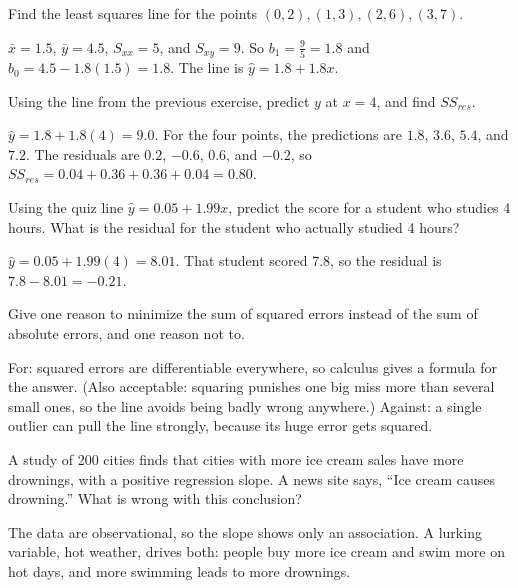 \begin{Exercise}[label=ls1, title=Solve by hand, space=3cm]
Find the least squares line for the points $(0,2), (1,3), (2,6), (3,7)$.
\end{Exercise}
\begin{Answer}[ref=ls1]
$\bar{x} = 1.5$, $\bar{y} = 4.5$, $S_{xx} = 5$, and $S_{xy} = 9$. So $b_1 = \frac{9}{5} = 1.8$ and
$b_0 = 4.5 - 1.8(1.5) = 1.8$. The line is $\hat{y} = 1.8 + 1.8x$.
\end{Answer}

\begin{Exercise}[label=ls2, title=Predict and check, space=3cm]
Using the line from the previous exercise, predict $y$ at $x = 4$, and find $SS_{res}$.
\end{Exercise}
\begin{Answer}[ref=ls2]
$\hat{y} = 1.8 + 1.8(4) = 9.0$. For the four points, the predictions are $1.8$, $3.6$, $5.4$, and $7.2$.
The residuals are $0.2$, $-0.6$, $0.6$, and $-0.2$, so $SS_{res} = 0.04 + 0.36 + 0.36 + 0.04 = 0.80$.
\end{Answer}

\begin{Exercise}[label=slr1, title=Predict a value]
Using the quiz line $\hat{y} = 0.05 + 1.99x$, predict the score for a student who studies 4 hours. What is the
residual for the student who actually studied 4 hours?
\end{Exercise}
\begin{Answer}[ref=slr1]
$\hat{y} = 0.05 + 1.99(4) = 8.01$. That student scored 7.8, so the residual is $7.8 - 8.01 = -0.21$.
\end{Answer}

\begin{Exercise}[label=ls3, title=Why square?]
Give one reason to minimize the sum of squared errors instead of the sum of absolute errors, and one reason
not to.
\end{Exercise}
\begin{Answer}[ref=ls3]
For: squared errors are differentiable everywhere, so calculus gives a formula for the answer. (Also
acceptable: squaring punishes one big miss more than several small ones, so the line avoids being badly wrong
anywhere.) Against: a single outlier can pull the line strongly, because its huge error gets squared.
\end{Answer}

\begin{Exercise}[label=slr4, title=Spot the problem]
A study of 200 cities finds that cities with more ice cream sales have more drownings, with a positive
regression slope. A news site says, ``Ice cream causes drowning.'' What is wrong with this conclusion?
\end{Exercise}
\begin{Answer}[ref=slr4]
The data are observational, so the slope shows only an association. A lurking variable, hot weather, drives
both: people buy more ice cream and swim more on hot days, and more swimming leads to more drownings.
\end{Answer}

